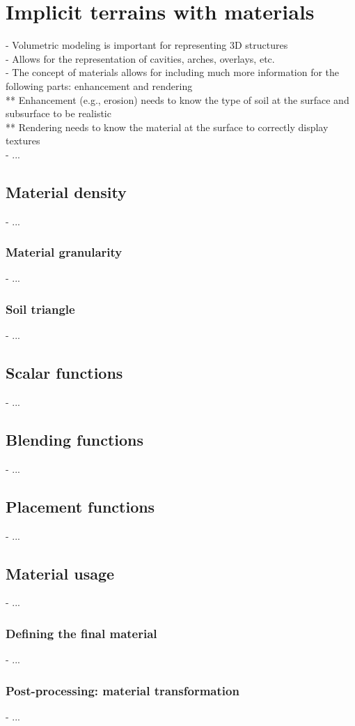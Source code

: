 
\chapter{Implicit terrains with materials}
\label{sec:state-of-the-art_implicit-terrain-with-materials}
- Volumetric modeling is important for representing 3D structures \\
- Allows for the representation of cavities, arches, overlays, etc. \\
- The concept of materials allows for including much more information for the following parts: enhancement and rendering \\
** Enhancement (e.g., erosion) needs to know the type of soil at the surface and subsurface to be realistic \\
** Rendering needs to know the material at the surface to correctly display textures \\
- ...

\section{Material density}
- ...

\subsection{Material granularity}
- ...

\subsection{Soil triangle}
- ...

\section{Scalar functions}
- ...

\section{Blending functions}
- ...

\section{Placement functions}
- ...

\section{Material usage}
- ...

\subsection{Defining the final material}
- ...

\subsection{Post-processing: material transformation}
- ...

